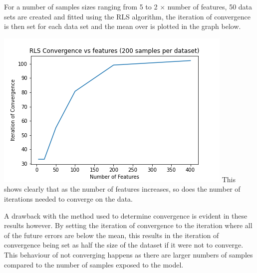 For a number of samples sizes ranging from 5 to 2 $\times$ number of features, 50 data sets are created and fitted using the RLS algorithm, the iteration of convergence is then set for each data set and the mean over is plotted in the graph below.

\includegraphics[width=\linewidth]{figs/RLSConvergence.png}
This shows clearly that as the number of features increases, so does the number of iterations needed to converge on the data.

A drawback with the method used to determine convergence is evident in these results however. By setting the iteration of convergence to the iteration where all of the future errors are below the mean, this results in the iteration of convergence being set as half the size of the dataset if it were not to converge. 
This behaviour of not converging happens as there are larger numbers of samples compared to the number of samples exposed to the model.  